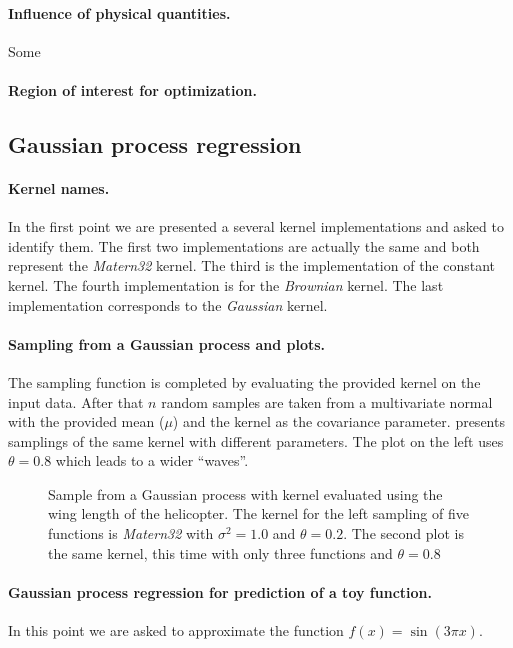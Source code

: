 \paragraph{Influence of physical quantities.}
Some

\paragraph{Region of interest for optimization.}

\subsection{Gaussian process regression}

\paragraph{Kernel names.} In the first point we are presented a several kernel
implementations and asked to identify them. The first two implementations are
actually the same and both represent the \emph{Matern32} kernel. The third is
the implementation of the constant kernel. The fourth implementation is for the
\emph{Brownian} kernel. The last implementation corresponds to the
\emph{Gaussian} kernel.

\paragraph{Sampling from a Gaussian process and plots.}
The sampling function is completed by evaluating the provided kernel on the
input data. After that $n$ random samples are taken from a multivariate normal
with the provided mean ($\mu$) and the kernel as the covariance parameter.
 presents samplings of the same kernel with different
parameters. The plot on the left uses $\theta=0.8$ which leads to a wider
``waves''.
\begin{figure}
  \centering
  
  \caption{Sample from a Gaussian process with kernel evaluated using the wing
  length of the helicopter. The kernel for the left sampling of five functions
  is \emph{Matern32} with $\sigma^2=1.0$ and $\theta=0.2$. The second plot is
  the same kernel, this time with only three functions and $\theta=0.8$}
  \label{fig_gpsamples}
\end{figure}

\paragraph{Gaussian process regression for prediction of a toy function.} In
this point we are asked to approximate the function $f(x) = \sin(3\pi x)$.

